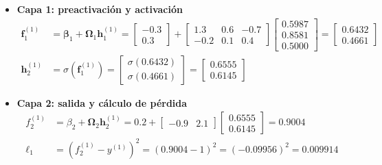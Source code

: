 \documentclass[10pt,a4paper]{article}
\begin{document}
\begin{itemize}
    \item \textbf{Capa 1: preactivación y activación}
    \begin{align*}
    \mathbf{f}_1^{(1)} &= \boldsymbol{\beta}_1 + \boldsymbol{\Omega}_1 \mathbf{h}_1^{(1)} = \begin{bmatrix} -0.3 \\ 0.3 \end{bmatrix} + \begin{bmatrix} 1.3 & 0.6 & -0.7 \\ -0.2 & 0.1 & 0.4 \end{bmatrix} \begin{bmatrix} 0.5987 \\ 0.8581 \\ 0.5000 \end{bmatrix} = \begin{bmatrix} 0.6432 \\ 0.4661 \end{bmatrix} \\[0.1cm]
    \mathbf{h}_2^{(1)} &= \sigma(\mathbf{f}_1^{(1)}) = \begin{bmatrix} \sigma(0.6432) \\ \sigma(0.4661) \end{bmatrix} = \begin{bmatrix} 0.6555 \\ 0.6145 \end{bmatrix}
    \end{align*}

    \item \textbf{Capa 2: salida y cálculo de pérdida}
    \begin{align*}
    f_2^{(1)} &= \beta_2 + \boldsymbol{\Omega}_2 \mathbf{h}_2^{(1)} = 0.2 + \begin{bmatrix} -0.9 & 2.1 \end{bmatrix} \begin{bmatrix} 0.6555 \\ 0.6145 \end{bmatrix} = 0.9004 \\[0.1cm]
    \ell_1 &= (f_2^{(1)} - y^{(1)})^2 = (0.9004 - 1)^2 = (-0.09956)^2 = \mathbf{0.009914}
    \end{align*}
\end{itemize}
\end{document}

